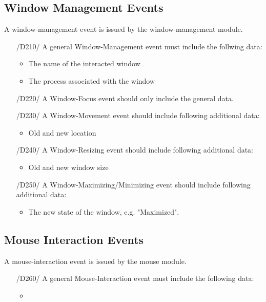\subsection{Window Management Events}

A window-management event is issued by the window-management module.

\begin{itemize}
\item[/D210/] A general Window-Management event must include the follwing data:
	\begin{itemize}
	\item The name of the interacted window
	\item The process associated with the window
	\end{itemize}

\item[/D220/] A Window-Focus event should only include the general data.

\item[/D230/] A Window-Movement event should include following additional data:
	\begin{itemize}
	\item Old and new location
	\end{itemize}
	
\item[/D240/] A Window-Resizing event should include following additional data:
	\begin{itemize}
	\item Old and new window size
	\end{itemize}
	
\item[/D250/] A Window-Maximizing/Minimizing event should include following additional data:
	\begin{itemize}
	\item The new state of the window, e.g. "Maximized".
	\end{itemize}
\end{itemize}

\subsection{Mouse Interaction Events}

A mouse-interaction event is issued by the mouse module.

\begin{itemize}
\item[/D260/] A general Mouse-Interaction event must include the following data:
	\begin{itemize}
	\item 
	\end{itemize}
\end{itemize}

